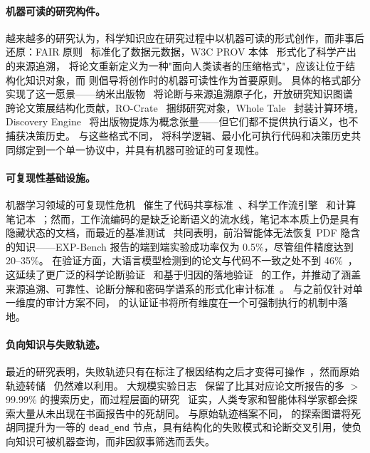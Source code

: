 \paragraph{机器可读的研究构件。}
越来越多的研究认为，科学知识应在研究过程中以机器可读的形式创作，而非事后还原：FAIR 原则~\citep{wilkinson2016fair} 标准化了数据元数据，W3C PROV 本体~\citep{lebo2013provo} 形式化了科学产出的来源追溯，\citet{canini2026stopwriting} 将论文重新定义为一种"面向人类读者的压缩格式"，应该让位于结构化知识对象，而 \citet{stocker2025machinereadable, booeshaghi2026machinereadable} 则倡导将创作时的机器可读性作为首要原则。
具体的格式部分实现了这一愿景——纳米出版物~\citep{groth2010nanopub} 将论断与来源追溯原子化，开放研究知识图谱~\citep{jaradeh2019orkg} 跨论文策展结构化贡献，RO-Crate~\citep{soilandreyes2022rocrate} 捆绑研究对象，Whole Tale~\citep{brinckman2019wholetale} 封装计算环境，Discovery Engine~\citep{baulin2025discoveryengine} 将出版物提炼为概念张量——但它们都不提供执行语义，也不捕获决策历史。
与这些格式不同，\ara{} 将科学逻辑、最小化可执行代码和决策历史共同绑定到一个单一协议中，并具有机器可验证的可复现性。

\paragraph{可复现性基础设施。}
机器学习领域的可复现性危机~\citep{baker2016reproducibility, pineau2021reproducibility} 催生了代码共享标准~\citep{stodden2016enhancing}、科学工作流引擎~\citep{koster2012snakemake, ditommaso2017nextflow, crusoe2022cwl} 和计算笔记本~\citep{knuth1984literate, rule2018exploration}；然而，工作流编码的是缺乏论断语义的流水线，笔记本本质上仍是具有隐藏状态的文档，而最近的基准测试~\citep{starace2025paperbench, liu2026scireasoning, kon2025expbench} 共同表明，前沿智能体无法恢复 PDF 隐含的知识——EXP-Bench 报告的端到端实验成功率仅为 0.5\%，尽管组件精度达到 20--35\%。
在验证方面，大语言模型检测到的论文与代码不一致之处不到 46\%~\citep{baumgartner2026scicoqa}，这延续了更广泛的科学论断验证~\citep{wadden2020scifact} 和基于归因的落地验证~\citep{gao2023rarr} 的工作，并推动了涵盖来源追溯、可靠性、论断分解和密码学谱系的形式化审计标准~\citep{rasheed2026aar, huang2025decmetrics, radanliev2026aibom}。
与之前仅针对单一维度的审计方案不同，\ara{} 的认证证书将所有维度在一个可强制执行的机制中落地。

\paragraph{负向知识与失败轨迹。}
最近的研究表明，失败轨迹只有在标注了根因结构之后才变得可操作~\citep{zhu2025agenterrorbench, zhang2025agentracer}，然而原始轨迹转储~\citep{yang2024sweagent} 仍然难以利用。
大规模实验日志~\citep{pinedaarango2021hpob, ying2019nasbench, gijsbers2019automl} 保留了比其对应论文所报告的多 $>$99.99\% 的搜索历史，而过程层面的研究~\citep{wijk2025rebench, yamada2025aiscientistv2} 证实，人类专家和智能体科学家都会探索大量从未出现在书面报告中的死胡同。
与原始轨迹档案不同，\ara{} 的探索图谱将死胡同提升为一等的 \texttt{dead\_end} 节点，具有结构化的失败模式和论断交叉引用，使负向知识可被机器查询，而非因叙事筛选而丢失。

